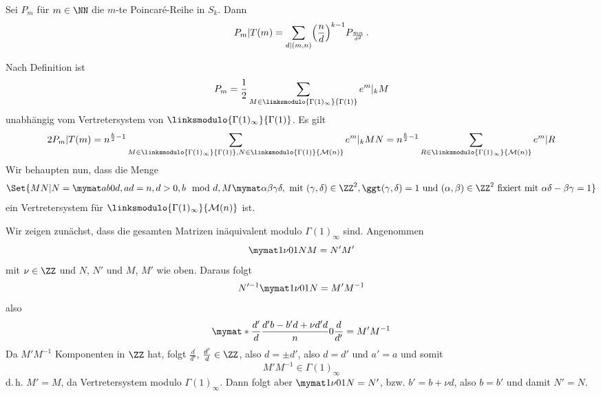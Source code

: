 \begin{satz}
	Sei $P_m$ für $m \in \NN$ die $m$-te Poincaré-Reihe in $S_k$.
	Dann
	\[
		P_m | T(m) = \sum_{d | (m,n)} \Bigl( \frac{n}{d} \Bigr)^{k-1} P_{\frac{mn}{d^2}}
		\,.
	\]
\end{satz}
\begin{bewe}
	Nach Definition ist
	\[
		P_m = \frac{1}{2} \sum_{M\in \linksmodulo{\Gamma(1)_\infty}{\Gamma(1)}} e^m |_k M
	\]
	unabhängig vom Vertretersystem von $\linksmodulo{\Gamma(1)_\infty}{\Gamma(1)}$.
	Es gilt
	\[
		2 P_m | T(m) = n^{\frac{k}{2}-1} \sum_{M \in \linksmodulo{\Gamma(1)_\infty}{\Gamma(1)}, N \in \linksmodulo{\Gamma(1)}{\mathcal{M}(n)}} e^m|_k MN
		= n^{\frac{k}{2}-1} \sum_{R \in \linksmodulo{\Gamma(1)_\infty}{\mathcal{M}(n)}} e^m|R
	\]
	Wir behaupten nun, dass die Menge 
	\[
		\Set{MN | N = \mymat ab0d, ad=n, d>0, b \mod d, M \mymat \alpha\beta\gamma\delta, \text{ mit } (\gamma, \delta) \in \ZZ^2, \ggt(\gamma, \delta) = 1 \text{ und } (\alpha, \beta) \in \ZZ^2 \text{ fixiert mit } \alpha\delta - \beta\gamma = 1}
	\]
	ein Vertretersystem für $\linksmodulo{\Gamma(1)_\infty}{\mathcal{M}(n)}$ ist.
	
	Wir zeigen zunächst, dass die gesamten Matrizen inäquivalent modulo $\Gamma(1)_\infty$ sind.
	Angenommen
	\[
		\mymat 1\nu01 NM = N'M'
	\]
	mit $\nu \in \ZZ$ und $N$, $N'$ und $M$, $M'$ wie oben.
	Daraus folgt
	\[
		N'^{-1} \mymat 1\nu01 N = M'M^{-1}
	\]
	also
	\[
		\mymat*{\frac{d'}{d}}{\frac{d'b-b'd+\nu d'd}{n}}{0}{\frac{d}{d'}}
		= M' M^{-1}
	\]
	Da $M'M^{-1}$ Komponenten in $\ZZ$ hat, folgt $\frac{d}{d'}$, $\frac{d'}{d} \in \ZZ$, also $d = \pm d'$, also $d = d'$ und $a' = a$ und somit 
	\[
		M'M^{-1} \in \Gamma(1)_\infty
	\]
	d.\,h. $M' = M$, da Vertretersystem modulo $\Gamma(1)_\infty$.
	Dann folgt aber $\mymat 1\nu01 N = N'$, bzw. $b' = b + \nu d$, also $b = b'$ und damit $N' = N$.
\end{bewe}